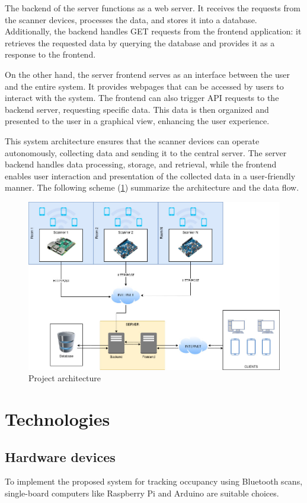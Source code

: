 \documentclass[a4paper, 11pt]{article}
\begin{document}
The backend of the server functions as a web server. It receives the requests from the scanner devices, processes the data, and stores it into a database. Additionally, the backend handles GET requests from the frontend application: it retrieves the requested data by querying the database and provides it as a response to the frontend.

On the other hand, the server frontend serves as an interface between the user and the entire system. It provides webpages that can be accessed by users to interact with the system. The frontend can also trigger API requests to the backend server, requesting specific data. This data is then organized and presented to the user in a graphical view, enhancing the user experience.

This system architecture ensures that the scanner devices can operate autonomously, collecting data and sending it to the central server. The server backend handles data processing, storage, and retrieval, while the frontend enables user interaction and presentation of the collected data in a user-friendly manner. The following scheme (\ref{fig:system-architecture}) summarize the architecture and the data flow.

\begin{figure}[H]
    \centering
    \includegraphics[width=1\linewidth]{images/WNMA-ProjectScheme.jpg}
    \caption{Project architecture}
    \label{fig:system-architecture}
\end{figure}


\section{Technologies}
\subsection{Hardware devices}
To implement the proposed system for tracking occupancy using Bluetooth scans, single-board computers like Raspberry Pi \cite{RPI} and Arduino \cite{arduino} are suitable choices. 
\end{document}
